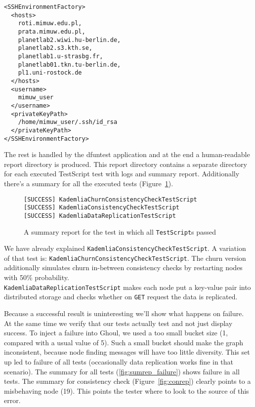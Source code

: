 \begin{verbatim}
<SSHEnvironmentFactory>
  <hosts>
    roti.mimuw.edu.pl,
    prata.mimuw.edu.pl,
    planetlab2.wiwi.hu-berlin.de,
    planetlab2.s3.kth.se,
    planetlab1.u-strasbg.fr,
    planetlab01.tkn.tu-berlin.de,
    pl1.uni-rostock.de
  </hosts>
  <username>
    mimuw_user
  </username>
  <privateKeyPath>
    /home/mimuw_user/.ssh/id_rsa
  </privateKeyPath>
</SSHEnvironmentFactory>
\end{verbatim}

The rest is handled by the dfuntest application and at the end a human-readable
report directory is produced. This report directory contains a separate
directory for each executed TestScript test with logs and summary report.
Additionally there's a summary for all the executed tests
(Figure~\ref{fig:sumrep}).

\begin{figure}[tbp]
\begin{verbatim}
[SUCCESS] KademliaChurnConsistencyCheckTestScript
[SUCCESS] KademliaConsistencyCheckTestScript
[SUCCESS] KademliaDataReplicationTestScript
\end{verbatim}
\caption{A summary report for the test in which all \texttt{TestScript}s passed}
\label{fig:sumrep}
\end{figure}

We have already explained \texttt{KademliaConsistencyCheckTestScript}. 
A variation of that test is:
\texttt{KademliaChurnConsistencyCheckTestScript}. 
The churn version additionally simulates churn in-between consistency checks by
restarting nodes with 50\% probability.\\
\texttt{KademliaDataReplicationTestScript} makes each node put a key-value pair
into distributed storage and checks whether on \texttt{GET} request the data is
replicated.

Because a successful result is uninteresting we'll show what happens on failure.
At the same time we verify that our tests actually test and not just display
success.
To inject a failure into Ghoul, we used a too small bucket size (1, compared
with a usual value of 5).
Such a small bucket should make the graph inconsistent, because node finding
messages will have too little diversity.
This set up led to failure of all tests (occasionally data replication works
fine in that scenario).
The summary for all tests (\ref{fig:sumrep_failure}) shows failure in all
tests.
The summary for consistency check (Figure~\ref{fig:conrep}) clearly points to a
misbehaving node (19). 
This points the tester where to look to the source of this error.

